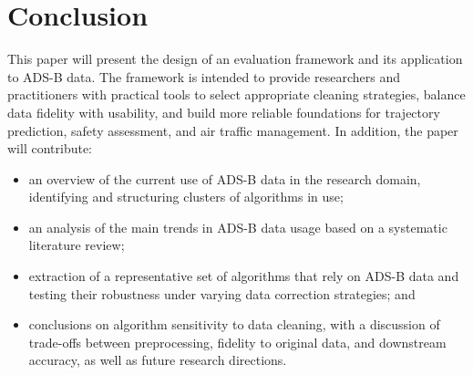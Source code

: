 \section{Conclusion}


This paper will present the design of an evaluation framework and its application to ADS-B data. 
The framework is intended to provide researchers and practitioners with practical tools to select appropriate cleaning strategies, 
balance data fidelity with usability, and build more reliable foundations for trajectory prediction, safety assessment, and air traffic management. 
In addition, the paper will contribute:
\begin{itemize}
  \item an overview of the current use of ADS-B data in the research domain, identifying and structuring clusters of algorithms in use;
  \item an analysis of the main trends in ADS-B data usage based on a systematic literature review;
  \item extraction of a representative set of algorithms that rely on ADS-B data and testing their robustness under varying data correction strategies; and
  \item conclusions on algorithm sensitivity to data cleaning, with a discussion of trade-offs between preprocessing, fidelity to original data, and downstream accuracy, as well as future research directions.
\end{itemize}